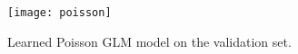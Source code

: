\begin{answer}
	\begin{figure}[H]
		\centering
		\texttt{[image: poisson]}
		\caption{Learned Poisson GLM model on the validation set.}
	\end{figure}
\end{answer}
